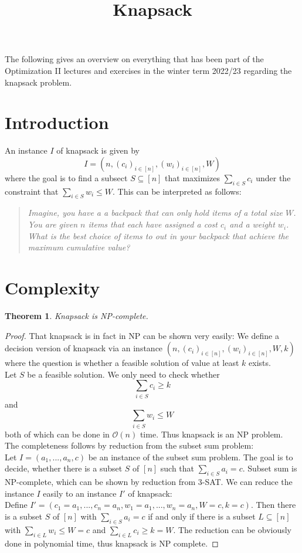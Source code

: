 \documentclass[a4paper, 12pt]{article}
\newtheorem{theorem}{Theorem}[section]
\begin{document}
	\begin{titlepage} 
		\title{Knapsack}
		\clearpage\maketitle
		\thispagestyle{empty}
	\end{titlepage}
	The following gives an overview on everything that has been part of the Optimization II lectures and exercises in the winter term 2022/23 regarding the knapsack problem. 
	\section{Introduction}
	An instance $I$ of knapsack is given by \[I = (n,(c_i)_{i \in [n]}, (w_i)_{i \in [n]}, W)\]
	where the goal is to find a subsect $S \subseteq [n]$ that maximizes $\sum_{i \in S} c_i$ under the constraint that $\sum_{i \in S} w_i \leq W$. This can be interpreted as follows:
	\begin{quote}
		\textit{Imagine, you have a a backpack that can only hold items of a total size $W$. You are given $n$ items that each have assigned a cost $c_i$ and a weight $w_i$. What is the best choice of items to out in your backpack that achieve the maximum cumulative value?}
	\end{quote}
	\section{Complexity}
	\begin{theorem}
		Knapsack is NP-complete.
	\end{theorem}
	\begin{proof}
		That knapsack is in fact in NP can be shown very easily:
		We define a decision version of knapsack via an instance $(n,(c_i)_{i \in [n]}, (w_i)_{i \in [n]}, W, k)$ where the question is whether a feasible solution of value at least $k$ exists.\\
		Let $S$ be a feasible solution. We only need to check whether \[\sum_{i \in S} c_i \geq k\] and \[\sum_{i \in S} w_i \leq W\]
		both of which can be done in $\mathcal{O}(n)$ time. Thus knapsack is an NP problem.\\
		The completeness follows by reduction from the subset sum problem:\\
		Let $I = (a_1,...,a_n, c)$ be an instance of the subset sum problem. The goal is to decide, whether there is a subset $S$ of $[n]$ such that $\sum_{i \in S} a_i = c$. Subset sum is NP-complete, which can be shown by reduction from 3-SAT. We can reduce the instance $I$ easily to an instance $I'$ of knapsack:\\
		Define $I' = (c_1 = a_1,...,c_n = a_n,w_1 = a_1,...,w_n  =a_n,W=c,k=c)$. Then there is a subset $S$ of $[n]$ with $\sum_{i \in S} a_i = c$ if and only if there is a subset $L \subseteq [n]$ with $\sum_{i \in L} w_i \leq W = c$ and $\sum_{i \in L} c_i \geq k = W$. The reduction can be obviously done in polynomial time, thus knapsack is NP complete.
	\end{proof}
\end{document}
